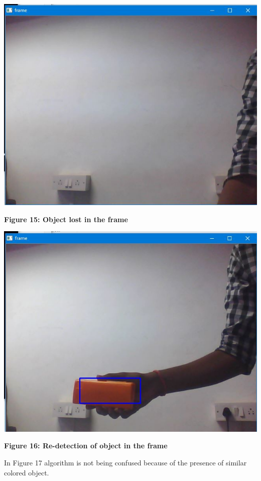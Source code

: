 \documentclass[11pt,a4paper]{article}
\begin{document}
	\begin{center}
		\includegraphics[scale=0.8]{Image2.JPG}
	\end{center}
	\begin{center}
		\textbf{Figure 15: Object lost in the frame}
	\end{center}
	\begin{center}
		\includegraphics[scale=0.8]{Image3.JPG}
	\end{center}
	\begin{center}
		\textbf{Figure 16: Re-detection of object in the frame}
	\end{center}
	 In Figure 17 algorithm is not being confused because of the presence of similar colored object.
\end{document}
